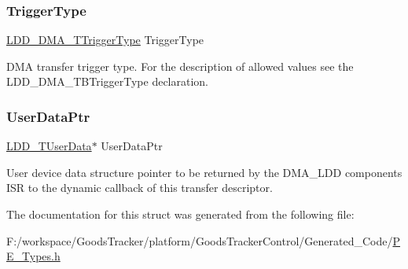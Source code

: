 \subsubsection{\texorpdfstring{Trigger\+Type}{TriggerType}}
{\footnotesize\ttfamily \hyperlink{group___p_e___types__module_ga5590e47d6e7263ae9257e0d231c89521}{L\+D\+D\+\_\+\+D\+M\+A\+\_\+\+T\+Trigger\+Type} Trigger\+Type}

D\+MA transfer trigger type. For the description of allowed values see the L\+D\+D\+\_\+\+D\+M\+A\+\_\+\+T\+B\+Trigger\+Type declaration. \mbox{\label{struct_l_d_d___d_m_a___t_transfer_descriptor_a8e77b9d030b00c231823350a904e0f83}} 
\subsubsection{\texorpdfstring{User\+Data\+Ptr}{UserDataPtr}}
{\footnotesize\ttfamily \hyperlink{group___p_e___types__module_ga0b66a73f87238a782318aa0be7578e35}{L\+D\+D\+\_\+\+T\+User\+Data}$\ast$ User\+Data\+Ptr}

User device data structure pointer to be returned by the D\+M\+A\+\_\+\+L\+DD component\textquotesingle{}s I\+SR to the dynamic callback of this transfer descriptor. 

The documentation for this struct was generated from the following file\+:\begin{DoxyCompactItemize}
\item 
F\+:/workspace/\+Goods\+Tracker/platform/\+Goods\+Tracker\+Control/\+Generated\+\_\+\+Code/\hyperlink{_p_e___types_8h}{P\+E\+\_\+\+Types.\+h}\end{DoxyCompactItemize}
